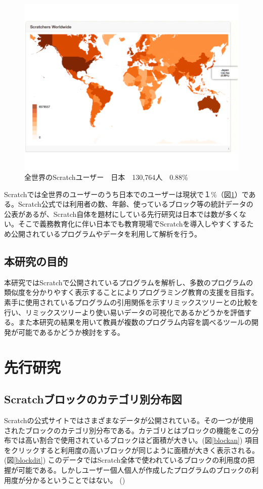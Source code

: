 \documentclass[a4paper,10pt,onecolumn,oneside,openany]{jsbook}
\begin{document}
\begin{figure}[h]
  \centering
    \includegraphics[scale=0.4]{graphic/world_japan.pdf}
  \caption{全世界のScratchユーザー　日本　130,764人　0.88\%}
  \label{num}
\end{figure}

Scratchでは全世界のユーザーのうち日本でのユーザーは現状で１\%（図\ref{num}）である。Scratch公式では利用者の数、年齢、使っているブロック等の統計データの公表があるが、Scratch自体を題材にしている先行研究は日本では数が多くない。そこで義務教育化に伴い日本でも教育現場でScratchを導入しやすくするため公開されているプログラムやデータを利用して解析を行う。

\newpage
\section{本研究の目的}

本研究ではScratchで公開されているプログラムを解析し、多数のプログラムの類似度を分かりやすく表示することによりプログラミング教育の支援を目指す。素手に使用されているプログラムの引用関係を示すリミックスツリーとの比較を行い、リミックスツリーより使い易いデータの可視化であるかどうかを評価する。また本研究の結果を用いて教員が複数のプログラム内容を調べるツールの開発が可能であるかどうか検討をする。
\chapter{先行研究}
\section{Scratchブロックのカテゴリ別分布図}
Scratchの公式サイトではさまざまなデータが公開されている。その一つが使用されたブロックのカテゴリ別分布である。カテゴリとはブロックの機能をこの分布では高い割合で使用されているブロックほど面積が大きい。(図\ref{blockan})
 項目をクリックすると利用度の高いブロックが同じように面積が大きく表示される。(図\ref{blockdit}) 
 このデータではScratch全体で使われているブロックの利用度の把握が可能である。しかしユーザー個人個人が作成したプログラムのブロックの利用度が分かるということではない。 
(\cite{preEssay3})
 
\end{document}

